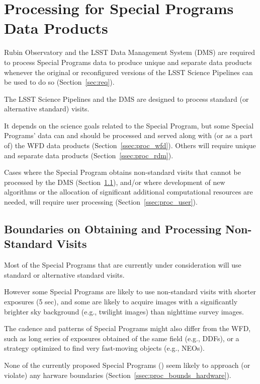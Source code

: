 \section{Processing for Special Programs Data Products}\label{sec:proc}

Rubin Observatory and the LSST Data Management System (DMS) are required 
to process Special Programs data to produce unique and separate data 
products whenever the original or reconfigured versions of the LSST 
Science Pipelines can be used to do so (Section~\ref{sec:req}).

The LSST Science Pipelines and the DMS are designed to process standard 
(or alternative standard) visits.

It depends on the science goals related to the Special Program, but some 
Special Programs' data can and should be processed and served along with 
(or as a part of) the WFD data products (Section~\ref{ssec:proc_wfd}).
Others will require unique and separate data products 
(Section~\ref{ssec:proc_rdm}). 

Cases where the Special Program obtains non-standard visits that cannot 
be processed by the DMS (Section~\ref{ssec:proc_bounds}), and/or where 
development of new algorithms or the allocation of significant additional 
computational resources are needed, will require user processing 
(Section~\ref{ssec:proc_user}).


\subsection{Boundaries on Obtaining and Processing Non-Standard Visits} \label{ssec:proc_bounds}

Most of the Special Programs that are currently under consideration will 
use standard or alternative standard visits.

However some Special Programs are likely to use non-standard visits with 
shorter exposures (5 sec), and some are likely to acquire images with a 
significantly brighter sky background (e.g., twilight images) than 
nighttime survey images.

The cadence and patterns of Special Programs might also differ from the 
WFD, such as long series of exposures obtained of the same field 
(e.g., DDFs), or a strategy optimized to find very fast-moving objects 
(e.g., NEOs).

None of the currently proposed Special Programs () 
seem likely to approach (or violate) any harware boundaries 
(Section~\ref{ssec:proc_bounds_hardware}).

